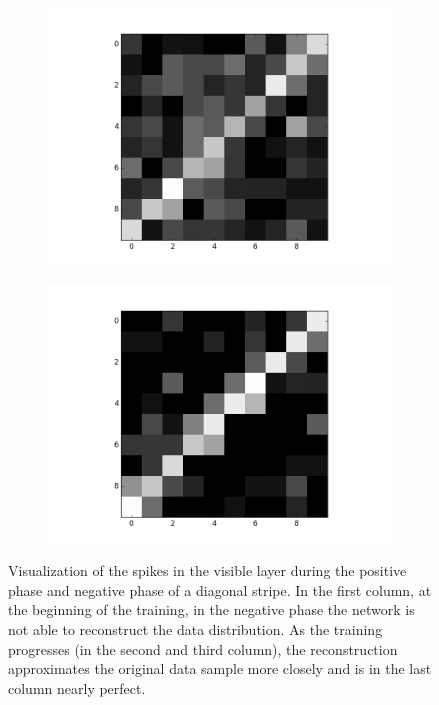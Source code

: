 \begin{figure}[h!]
\begin{subfigure}{.25\textwidth}
  		\includegraphics[width=\linewidth]{imgs/reconst/00006.png}
  		\label{fig:sub1}
	\end{subfigure}%
	\begin{subfigure}{.25\textwidth}
  		\centering
  		\includegraphics[width=\linewidth]{imgs/reconst/00008.png}
  		\label{fig:sub1}
	\end{subfigure}%
	\caption{Visualization of the spikes in the visible layer during the positive phase and negative phase of a diagonal stripe. In the first column, at the beginning of the training, in the negative phase the network is not able to reconstruct the data distribution. As the training progresses (in the second and third column), the reconstruction approximates the original data sample more closely and is in the last column nearly perfect.}
	\label{fig:posnegstrec}
\end{figure}

